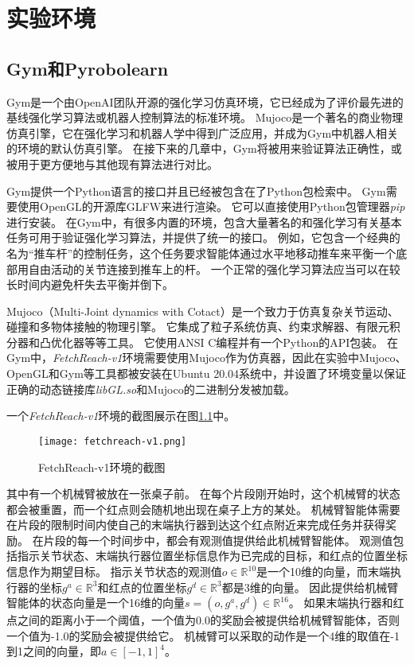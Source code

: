 
\chapter{实验环境}

\section{Gym和Pyrobolearn}
Gym\cite{brockman2016openai}是一个由OpenAI团队开源的强化学习仿真环境，它已经成为了评价最先进的基线强化学习算法或机器人控制算法的标准环境。
Mujoco\cite{todorov2012mujoco}是一个著名的商业物理仿真引擎，它在强化学习和机器人学中得到广泛应用，并成为Gym中机器人相关的环境的默认仿真引擎。
在接下来的几章中，Gym将被用来验证算法正确性，或被用于更方便地与其他现有算法进行对比。

Gym提供一个Python语言的接口并且已经被包含在了Python包检索中。
Gym需要使用OpenGL的开源库GLFW来进行渲染。
它可以直接使用Python包管理器\emph{pip}进行安装。
在Gym中，有很多内置的环境，包含大量著名的和强化学习有关基本任务可用于验证强化学习算法，并提供了统一的接口。
例如，它包含一个经典的名为“推车杆”的控制任务，这个任务要求智能体通过水平地移动推车来平衡一个底部用自由活动的关节连接到推车上的杆。
一个正常的强化学习算法应当可以在较长时间内避免杆失去平衡并倒下。

Mujoco（Multi-Joint dynamics with Cotact）是一个致力于仿真复杂关节运动、碰撞和多物体接触的物理引擎。
它集成了粒子系统仿真、约束求解器、有限元积分器和凸优化器等等工具。
它使用ANSI C编程并有一个Python的API包装。
在Gym中，\emph{FetchReach-v1}环境需要使用Mujoco作为仿真器，因此在实验中Mujoco、OpenGL和Gym等工具都被安装在Ubuntu 20.04系统中，并设置了环境变量以保证正确的动态链接库\emph{libGL.so}和Mujoco的二进制分发被加载。

一个\emph{FetchReach-v1}环境的截图展示在图\ref{fetchreach-v1}中。
    \begin{figure}
        \centering
        \texttt{[image: fetchreach-v1.png]}
        \caption{FetchReach-v1环境的截图}
        \label{fetchreach-v1}
    \end{figure}
其中有一个机械臂被放在一张桌子前。
在每个片段刚开始时，这个机械臂的状态都会被重置，而一个红点则会随机地出现在桌子上方的某处。
机械臂智能体需要在片段的限制时间内使自己的末端执行器到达这个红点附近来完成任务并获得奖励。
在片段的每一个时间步中，都会有观测值提供给此机械臂智能体。
观测值包括指示关节状态、末端执行器位置坐标信息作为已完成的目标，和红点的位置坐标信息作为期望目标。
指示关节状态的观测值$o\in \mathbb R^{10}$是一个10维的向量，而末端执行器的坐标$g^a \in \mathbb R^3$和红点的位置坐标$g^d\in\mathbb R^3$都是3维的向量。
因此提供给机械臂智能体的状态向量是一个16维的向量$s=(o, g^a, g^d)\in \mathbb R^{16}$。
如果末端执行器和红点之间的距离小于一个阈值，一个值为0.0的奖励会被提供给机械臂智能体，否则一个值为-1.0的奖励会被提供给它。
机械臂可以采取的动作是一个4维的取值在-1到1之间的向量，即$a\in[-1,1]^4$。

